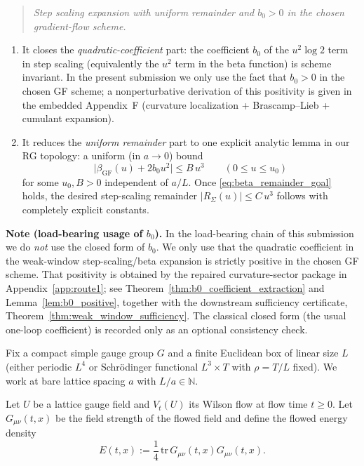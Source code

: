 \begin{quote}
\emph{Step scaling expansion with uniform remainder and $b_0>0$ in the chosen gradient-flow scheme.}
\end{quote}

\begin{enumerate}
\item It closes the \emph{quadratic-coefficient} part: the coefficient $b_0$ of the $u^2\log 2$ term in step scaling (equivalently the $u^2$ term in the beta function) is scheme invariant.
In the present submission we only use the fact that $b_0>0$ in the chosen GF scheme; a nonperturbative derivation of this positivity is given in the embedded Appendix~F (curvature localization + Brascamp--Lieb + cumulant expansion).

\item It reduces the \emph{uniform remainder} part to one explicit analytic lemma in our RG topology: a uniform (in $a\to 0$) bound
\begin{equation}
\label{eq:beta_remainder_goal}
\bigl|\beta_{\mathrm{GF}}(u) + 2 b_0 u^2\bigr|\le B\,u^3\qquad (0\le u\le u_0)
\end{equation}
for some $u_0,B>0$ independent of $a/L$. Once \eqref{eq:beta_remainder_goal} holds, the desired step-scaling remainder
$|R_\Sigma(u)|\le C\,u^3$ follows with completely explicit constants.
\end{enumerate}

\noindent\textbf{Note (load-bearing usage of $b_0$).}
In the load-bearing chain of this submission we do \emph{not} use the closed form of $b_0$.
We only use that the quadratic coefficient in the weak-window step-scaling/beta expansion is strictly positive in the chosen GF scheme.
That positivity is obtained by the repaired curvature-sector package in Appendix~\ref{app:route1};
see Theorem~\ref{thm:b0_coefficient_extraction} and Lemma~\ref{lem:b0_positive}, together with the downstream sufficiency certificate, Theorem~\ref{thm:weak_window_sufficiency}.
The classical closed form (the usual one-loop coefficient) is recorded only as an optional consistency check.

Fix a compact simple gauge group $G$ and a finite Euclidean box of linear size $L$ (either periodic $L^4$ or Schr\"odinger functional $L^3\times T$ with $\rho=T/L$ fixed). We work at bare lattice spacing $a$ with $L/a\in\mathbb N$.

Let $U$ be a lattice gauge field and $V_t(U)$ its Wilson flow at flow time $t\ge 0$.
Let $G_{\mu\nu}(t,x)$ be the field strength of the flowed field and define the flowed energy density
\begin{equation}
E(t,x):=\frac14\,\mathrm{tr}\,G_{\mu\nu}(t,x)G_{\mu\nu}(t,x).
\end{equation}

